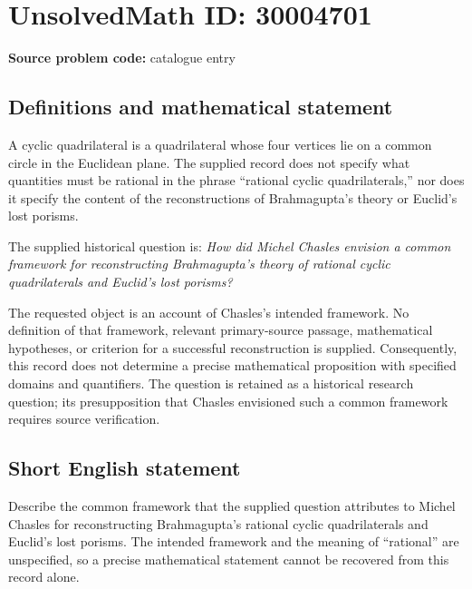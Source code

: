 \documentclass[11pt]{article}
\begin{document}
\section*{UnsolvedMath ID: 30004701}
\textbf{Source problem code:} catalogue entry
\subsection{Definitions and mathematical statement}
A cyclic quadrilateral is a quadrilateral whose four vertices lie on a common circle in the Euclidean plane. The supplied record does not specify what quantities must be rational in the phrase ``rational cyclic quadrilaterals,'' nor does it specify the content of the reconstructions of Brahmagupta's theory or Euclid's lost porisms.

The supplied historical question is: \emph{How did Michel Chasles envision a common framework for reconstructing Brahmagupta's theory of rational cyclic quadrilaterals and Euclid's lost porisms?}

The requested object is an account of Chasles's intended framework. No definition of that framework, relevant primary-source passage, mathematical hypotheses, or criterion for a successful reconstruction is supplied. Consequently, this record does not determine a precise mathematical proposition with specified domains and quantifiers. The question is retained as a historical research question; its presupposition that Chasles envisioned such a common framework requires source verification.
\subsection{Short English statement}
Describe the common framework that the supplied question attributes to Michel Chasles for reconstructing Brahmagupta's rational cyclic quadrilaterals and Euclid's lost porisms. The intended framework and the meaning of ``rational'' are unspecified, so a precise mathematical statement cannot be recovered from this record alone.
\end{document}
